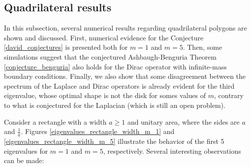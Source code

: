 \subsection{Quadrilateral results}\label{chap_numerics_dirac_quad_section}

In this subsection, several numerical results regarding quadrilateral polygons are shown and discussed. First, numerical evidence for the Conjecture \ref{david_conjectures} is presented both for \(m=1\) and \(m=5\). Then, some simulations suggest that the conjectured Ashbaugh-Benguria Theorem \ref{conjecture_benguria} also holds for the Dirac operator with infinite-mass boundary conditions. Finally, we also show that some disagreement between the spectrum of the Laplace and Dirac operators is already evident for the third eigenvalue, whose optimal shape is not the disk for somes values of \(m\), contrary to what is conjectured for the Laplacian (which is still an open problem).

Consider a rectangle with a width \(a \geq 1\) and unitary area, where the sides are \(a\) and \(\frac{1}{a}\). Figures \ref{eigenvalues_rectangle_width_m_1} and \ref{eigenvalues_rectangle_width_m_5} illustrate the behavior of the first 5 eigenvalues for \(m=1\) and \(m=5\), respectively. Several interesting observations can be made:

